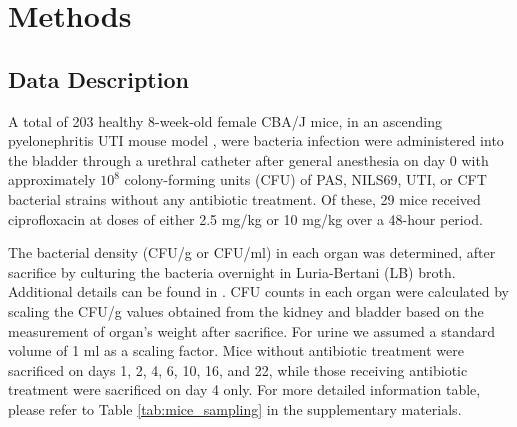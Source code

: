 \documentclass{article}
\begin{document}
\section{Methods}






\subsection{Data Description}




A total of 203 healthy 8-week-old female CBA/J mice,  in an ascending pyelonephritis UTI mouse model \cite{labat2005mutator}, were bacteria infection were administered into the bladder through a urethral catheter after general anesthesia on day 0 with approximately $10^8$ colony-forming units (CFU) of PAS, NILS69, UTI, or CFT bacterial strains without any antibiotic treatment. Of these, 29 mice received ciprofloxacin at doses of either 2.5 mg/kg or 10 mg/kg over a 48-hour period.

The bacterial density (CFU/g or CFU/ml) in each organ was determined, after sacrifice by culturing the bacteria overnight in Luria-Bertani (LB) broth. Additional details can be found in \cite{amoura2024variability}.
CFU counts in each organ were calculated by scaling the CFU/g values obtained from the kidney and bladder based on the measurement of organ's weight after sacrifice. For urine we assumed a standard volume of 1 ml as a scaling factor. Mice without antibiotic treatment were sacrificed on days 1, 2, 4, 6, 10, 16, and 22, while those receiving antibiotic treatment were sacrificed on day 4 only. For more detailed information table, please refer  to Table \ref{tab:mice_sampling} in the supplementary materials.


\end{document}
